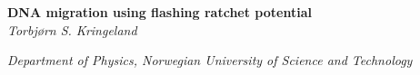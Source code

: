 
\begin{center}
{ \LARGE \bfseries DNA migration using flashing ratchet potential}\\[0.3cm]
 
\normalsize
\emph{Torbjørn S. Kringeland}

\small
\emph{Department of Physics, Norwegian University of Science and Technology}

\end{center}